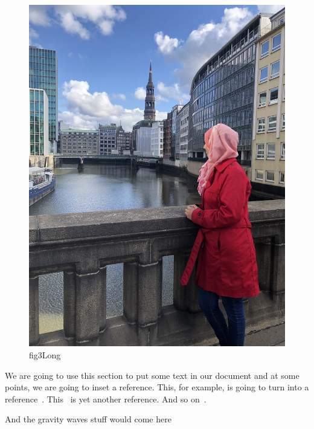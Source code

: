 \begin{figure}
	\centering
	\includegraphics[width=0.7\linewidth]{chapters/chapter2/FigureCh2/img2}
	\caption[fig3short]{fig3Long}
	\label{fig:img3}
\end{figure}

\lipsum[1-5]

We are going to use this section to put some text in our document and at some points, we are going to inset a reference. This, for example, is going to turn into a reference~\cite{Control-CDW-Okamoto-1992}. This~\cite{Lattice-Dynamics-Fehske-2000} is yet another reference. And so on~\cite{Dynamical-Monkowsky-2017}.

And the gravity waves stuff would come here~\cite{Gravity-Wave-2015}
